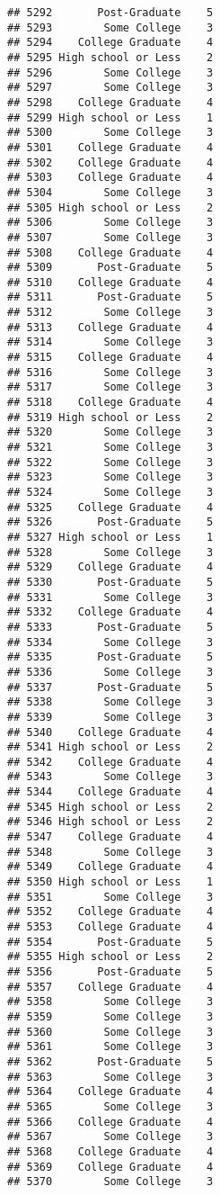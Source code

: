 \documentclass[
]{article}
\begin{document}
\begin{verbatim}
## 5292       Post-Graduate    5
## 5293        Some College    3
## 5294    College Graduate    4
## 5295 High school or Less    2
## 5296        Some College    3
## 5297        Some College    3
## 5298    College Graduate    4
## 5299 High school or Less    1
## 5300        Some College    3
## 5301    College Graduate    4
## 5302    College Graduate    4
## 5303    College Graduate    4
## 5304        Some College    3
## 5305 High school or Less    2
## 5306        Some College    3
## 5307        Some College    3
## 5308    College Graduate    4
## 5309       Post-Graduate    5
## 5310    College Graduate    4
## 5311       Post-Graduate    5
## 5312        Some College    3
## 5313    College Graduate    4
## 5314        Some College    3
## 5315    College Graduate    4
## 5316        Some College    3
## 5317        Some College    3
## 5318    College Graduate    4
## 5319 High school or Less    2
## 5320        Some College    3
## 5321        Some College    3
## 5322        Some College    3
## 5323        Some College    3
## 5324        Some College    3
## 5325    College Graduate    4
## 5326       Post-Graduate    5
## 5327 High school or Less    1
## 5328        Some College    3
## 5329    College Graduate    4
## 5330       Post-Graduate    5
## 5331        Some College    3
## 5332    College Graduate    4
## 5333       Post-Graduate    5
## 5334        Some College    3
## 5335       Post-Graduate    5
## 5336        Some College    3
## 5337       Post-Graduate    5
## 5338        Some College    3
## 5339        Some College    3
## 5340    College Graduate    4
## 5341 High school or Less    2
## 5342    College Graduate    4
## 5343        Some College    3
## 5344    College Graduate    4
## 5345 High school or Less    2
## 5346 High school or Less    2
## 5347    College Graduate    4
## 5348        Some College    3
## 5349    College Graduate    4
## 5350 High school or Less    1
## 5351        Some College    3
## 5352    College Graduate    4
## 5353    College Graduate    4
## 5354       Post-Graduate    5
## 5355 High school or Less    2
## 5356       Post-Graduate    5
## 5357    College Graduate    4
## 5358        Some College    3
## 5359        Some College    3
## 5360        Some College    3
## 5361        Some College    3
## 5362       Post-Graduate    5
## 5363        Some College    3
## 5364    College Graduate    4
## 5365        Some College    3
## 5366    College Graduate    4
## 5367        Some College    3
## 5368    College Graduate    4
## 5369    College Graduate    4
## 5370        Some College    3

\end{verbatim}
\end{document}
